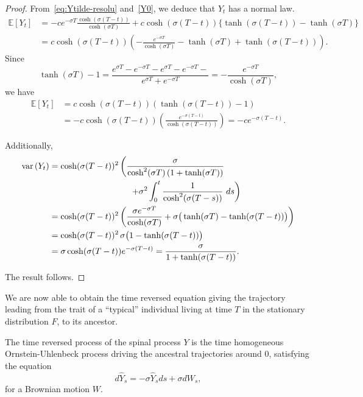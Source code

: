 \documentclass[AHL,Unicode,longabstracts,published]{cedram}
\newcommand*\E{\mathbb{E}}
\newcommand*\s{\sigma}
\begin{document}
\begin{proof}
From~\eqref{eq:Ytilde-resolu} and~\eqref{Y0}, we deduce that $Y_{t}$ has a normal law.
\begin{align*}
\E\left[Y_{t}\right]&=-ce^{-\s T}\frac{\cosh(\s(T-t))}{\cosh(\s T)}+c\cosh(\s(T-t))\big\{\tanh(\s (T-t))-\tanh(\s T) \big\}\\
&=c\cosh(\s (T-t))\left(-\frac{e^{-\s T}}{\cosh(\s T)}-\tanh(\s T)+\tanh(\s(T-t)) \right).
\end{align*}
Since
\begin{equation}\label{eq:1}
\tanh(\s T)-1=\frac{e^{\s T}-e^{-\s T}-e^{\s T}-e^{-\s T}-}{e^{\s T}+e^{-\s T}}=-\frac{e^{-\sigma T}}{\cosh(\s T)},
\end{equation}
we have
\begin{align*}
\E[Y_{t}]&=c\cosh(\s (T-t))\left(\tanh(\s(T-t))-1 \right)\\
&=-c\cosh(\s (T-t))\left(\frac{e^{-\s(T-t)}}{\cosh(\sigma (T-t))} \right)=-ce^{-\s(T-t)}.
\end{align*}

Additionally,
\begin{align*}
\text{var}\left({Y}_{t}\right)&=\cosh(\s (T-t))^{2}\left({\frac{\s}{\cosh^{2}(\s T)\left(1+\tanh(\s T)\right)}}\right.\\
&\mkern170mu\left.+{\s^{2}\int_{0}^{t}\frac{1}{\cosh^{2}(\s (T-s))}\ ds} \right)\\
&= \cosh(\s (T-t))^{2}\left(\frac{\s e^{-\s T}}{\cosh(\s T)}+ \sigma\big(\tanh(\sigma T)-\tanh(\s (T-t)) \big)\right)\\
&= \cosh(\s (T-t))^{2}\, \s\big(1-\tanh(\s(T-t))\big)\\
&=\sigma \cosh(\s(T-t))e^{-\s(T-t)}=\frac{\s}{1+\tanh(\s(T-t))}.
\end{align*}

The result follows.
\end{proof}


We are now able to obtain the time reversed equation giving the trajectory leading from the trait of a ``typical'' individual living at time $T$ in the stationary distribution $F$, to its ancestor.

\begin{prop}\label{reversed:2}
The time reversed process of the spinal process $ Y$ is the time homogeneous Ornstein-Uhlenbeck process driving the ancestral trajectories around $0$, satisfying the equation
\begin{equation}\label{rev-spine:OU}
d\widehat{Y}_{s}=-\sigma \widehat{Y}_{s}ds +\sigma d W_{s},
\end{equation}
for a Brownian motion $W$.
\end{prop}
\end{document}
